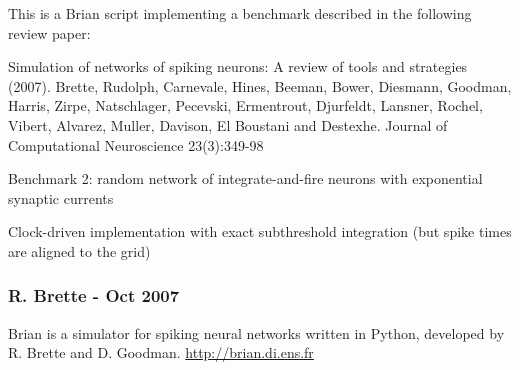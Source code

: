 \documentclass[letterpaper,10pt]{manual}
\begin{document}
This is a Brian script implementing a benchmark described
in the following review paper:

Simulation of networks of spiking neurons: A review of tools and strategies (2007).
Brette, Rudolph, Carnevale, Hines, Beeman, Bower, Diesmann, Goodman, Harris, Zirpe,
Natschlager, Pecevski, Ermentrout, Djurfeldt, Lansner, Rochel, Vibert, Alvarez, Muller,
Davison, El Boustani and Destexhe.
Journal of Computational Neuroscience 23(3):349-98

Benchmark 2: random network of integrate-and-fire neurons with exponential synaptic currents

Clock-driven implementation with exact subthreshold integration
(but spike times are aligned to the grid)


\subsubsection{R. Brette - Oct 2007}

Brian is a simulator for spiking neural networks written in Python, developed by
R. Brette and D. Goodman.
\href{http://brian.di.ens.fr}{http://brian.di.ens.fr}
\end{document}
